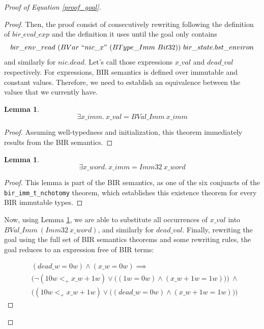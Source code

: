 \documentclass{kththesis}
\newtheorem{lemma}[theorem]{Lemma}
\begin{document}
{\begin{proof}[Proof of Equation \ref{proof_goal}]
\begin{proof}
Then, the proof consist of consecutively rewriting following the definition of $bir\_eval\_exp$ and the definition it uses until the goal only contains $$bir\_env\_read~(BVar~``nic\_x"~(BType\_Imm~Bit32))~bir\_state.bst\_environ$$ and similarly for $nic.dead$. Let's call those expressions $x\_val$ and $dead\_val$ respectively. For expressions, BIR semantics is defined over immutable and constant values. Therefore, we need to establish an equivalence between the values that we currently have.

\begin{lemma}
	\begin{equation*}
		\exists x\_imm.~x\_val = BVal\_Imm~x\_imm
	\end{equation*}
	\label{proof_exists_x_imm}
\end{lemma}
\begin{proof}
Assuming well-typedness and initialization, this theorem immediately results from the BIR semantics.
\end{proof}

\begin{lemma}
	\begin{equation*}
		\exists x\_word.~x\_imm = Imm32~x\_word
	\end{equation*}
	\label{proof_exists_x_word}
\end{lemma}
\begin{proof}
This lemma is part of the BIR semantics, as one of the six conjuncts of the \texttt{bir\_imm\_t\_nchotomy} theorem, which establishes this existence theorem for every BIR immutable types.
\end{proof}

Now, using Lemma \ref{proof_exists_x_imm}, we are able to substitute all occurrences of $x\_val$ into $BVal\_Imm~(Imm32~x\_word)$, and similarly for $dead\_val$. Finally, rewriting the goal using the full set of BIR semantics theorems and some rewriting rules, the goal reduces to an expression free of BIR terms:

\begin{equation} \label{proof_wp_word_goal}
\begin{split}
&(dead\_w = 0w) \land (x\_w = 0w) \implies\\
&\Big(\neg(10w <_{+} x\_w + 1w) \lor \big((1w = 0w) \land (x\_w + 1w = 1w)\big)\Big)~\land\\
&\Big((10w <_{+} x\_w + 1w) \lor \big((dead\_w = 0w) \land (x\_w + 1w = 1w)\big)\Big)
\end{split}
\end{equation}


\end{proof}
\end{proof}}
\end{document}

